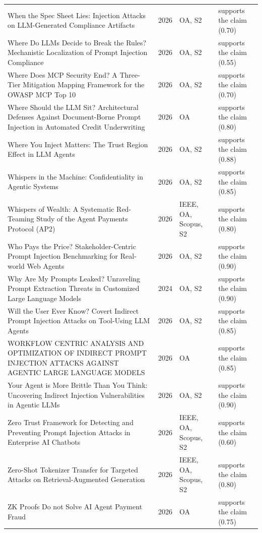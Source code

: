 \begin{longtable}{@{}%
  >{\raggedright\arraybackslash}p{}c%
  >{\raggedright\arraybackslash}p{}%
  >{\raggedright\arraybackslash}p{}@{}}
When the Spec Sheet Lies: Injection Attacks on LLM-Generated Compliance Artifacts & 2026 & OA, S2 & supports the claim (0.70) \\
Where Do LLMs Decide to Break the Rules? Mechanistic Localization of Prompt Injection Compliance & 2026 & OA, S2 & supports the claim (0.55) \\
Where Does MCP Security End? A Three-Tier Mitigation Mapping Framework for the OWASP MCP Top 10 & 2026 & OA, S2 & supports the claim (0.70) \\
Where Should the LLM Sit? Architectural Defenses Against Document-Borne Prompt Injection in Automated Credit Underwriting & 2026 & OA & supports the claim (0.80) \\
Where You Inject Matters: The Trust Region Effect in LLM Agents & 2026 & OA, S2 & supports the claim (0.88) \\
Whispers in the Machine: Confidentiality in Agentic Systems & 2026 & OA, S2 & supports the claim (0.85) \\
Whispers of Wealth: A Systematic Red-Teaming Study of the Agent Payments Protocol (AP2) & 2026 & IEEE, OA, Scopus, S2 & supports the claim (0.80) \\
Who Pays the Price? Stakeholder-Centric Prompt Injection Benchmarking for Real-world Web Agents & 2026 & OA, S2 & supports the claim (0.90) \\
Why Are My Prompts Leaked? Unraveling Prompt Extraction Threats in Customized Large Language Models & 2024 & OA, S2 & supports the claim (0.90) \\
Will the User Ever Know? Covert Indirect Prompt Injection Attacks on Tool-Using LLM Agents & 2026 & OA, S2 & supports the claim (0.85) \\
WORKFLOW CENTRIC ANALYSIS AND OPTIMIZATION OF INDIRECT PROMPT INJECTION ATTACKS AGAINST AGENTIC LARGE LANGUAGE MODELS & 2026 & OA & supports the claim (0.85) \\
Your Agent is More Brittle Than You Think: Uncovering Indirect Injection Vulnerabilities in Agentic LLMs & 2026 & OA, S2 & supports the claim (0.90) \\
Zero Trust Framework for Detecting and Preventing Prompt Injection Attacks in Enterprise AI Chatbots & 2026 & IEEE, OA, Scopus, S2 & supports the claim (0.60) \\
Zero-Shot Tokenizer Transfer for Targeted Attacks on Retrieval-Augmented Generation & 2026 & IEEE, OA, Scopus, S2 & supports the claim (0.80) \\
ZK Proofs Do not Solve AI Agent Payment Fraud & 2026 & OA & supports the claim (0.75) \\

\end{longtable}
